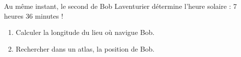 
Au même instant, le second de Bob Laventurier détermine l’heure solaire : 7 heures 36 minutes !
\begin{enumerate}
\item Calculer la longitude du lieu où navigue Bob.
\item Rechercher dans un atlas, la position de Bob.
\end{enumerate}

